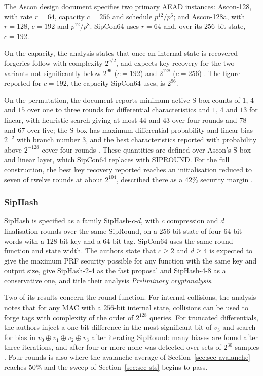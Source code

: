 The Ascon design document \cite{caesar} specifies two primary AEAD instances:
Ascon-128, with rate $r = 64$, capacity $c = 256$ and schedule $p^{12}/p^{6}$;
and Ascon-128a, with $r = 128$, $c = 192$ and $p^{12}/p^{8}$. SipCon64 uses
$r = 64$ and, over its $256$-bit state, $c = 192$.

On the capacity, the analysis states that once an internal state is recovered
forgeries follow with complexity $2^{c/2}$, and expects key recovery for the
two variants not significantly below $2^{96}$ ($c = 192$) and $2^{128}$
($c = 256$) \cite{caesar}. The figure reported for $c = 192$, the capacity
SipCon64 uses, is $2^{96}$.

On the permutation, the document reports minimum active S-box counts of $1$,
$4$ and $15$ over one to three rounds for differential characteristics and
$1$, $4$ and $13$ for linear, with heuristic search giving at most $44$ and
$43$ over four rounds and $78$ and $67$ over five; the S-box has maximum
differential probability and linear bias $2^{-2}$ with branch number $3$, and
the best characteristics reported with probability above $2^{-128}$ cover four
rounds \cite{caesar}. These quantities are defined over Ascon's S-box and
linear layer, which SipCon64 replaces with SIPROUND. For the full
construction, the best key recovery reported reaches an initialisation reduced
to seven of twelve rounds at about $2^{104}$, described there as a $42\%$
security margin \cite{caesar}.

\subsubsection{SipHash}

SipHash \cite{siphash} is specified as a family SipHash-$c$-$d$, with $c$
compression and $d$ finalisation rounds over the same SipRound, on a $256$-bit
state of four $64$-bit words with a $128$-bit key and a $64$-bit tag. SipCon64
uses the same round function and state width. The authors state that $c \ge 2$
and $d \ge 4$ is expected to give the maximum PRF security possible for any
function with the same key and output size, give SipHash-2-4 as the fast
proposal and SipHash-4-8 as a conservative one, and title their analysis
\emph{Preliminary cryptanalysis}.

Two of its results concern the round function. For internal collisions, the
analysis notes that for any MAC with a $256$-bit internal state, collisions can
be used to forge tags with complexity of the order of $2^{128}$ queries. For
truncated differentials, the authors inject a one-bit difference in the most
significant bit of $v_3$ and search for bias in $v_0 \oplus v_1 \oplus v_2
\oplus v_3$ after iterating SipRound: many biases are found after three
iterations, and after four or more none was detected over sets of $2^{30}$
samples \cite{siphash}. Four rounds is also where the avalanche average of
Section~\ref{sec:sec-avalanche} reaches $50\%$ and the sweep of
Section~\ref{sec:sec-sts} begins to pass.
